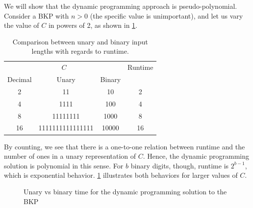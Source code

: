 \begin{example}

    We will show that the dynamic programming approach is pseudo-polynomial. Consider a BKP with $n > 0$ (the specific value is unimportant), and let us vary the value of $C$ in powers of 2, as shown in \cref{tab:kp runtimes table}.

    \begin{table}[h]
        \centering
        \caption{Comparison between unary and binary input lengths with regards to runtime.}
        \label{tab:kp runtimes table}
        \begin{tabular}{cccc}
            \toprule
            \multicolumn{3}{c}{$C$} & Runtime\\
            \cmidrule(lr){1-3}
            Decimal & Unary & Binary &\\
            \midrule
            2 & 11 & 10 & 2\\
            4 & 1111 & 100 & 4\\
            8 & 11111111 & 1000 & 8\\
            16 & 1111111111111111 & 10000 & 16\\
            \bottomrule
        \end{tabular}
    \end{table}

    By counting, we see that there is a one-to-one relation between runtime and the number of ones in a unary representation of $C$. Hence, the dynamic programming solution is polynomial in this sense. For $b$ binary digits, though, runtime is $2^{b-1}$, which is exponential behavior. \cref{fig:unary vs binary time} illustrates both behaviors for larger values of $C$.

    \begin{figure}[h]
        \centering
        \caption{Unary vs binary time for the dynamic programming solution to the BKP}
        \label{fig:unary vs binary time}
    \end{figure}

\end{example}

